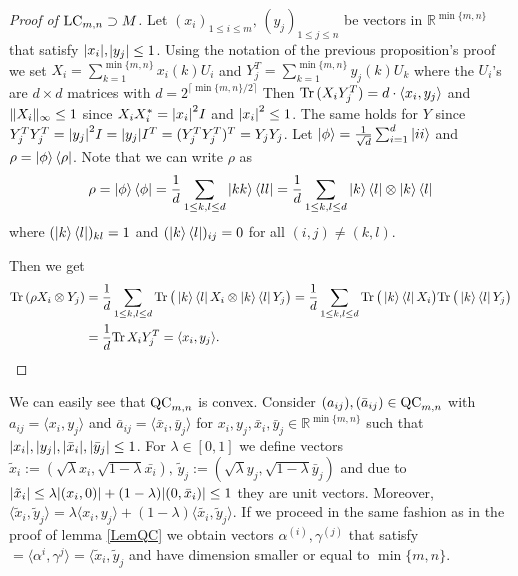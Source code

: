 \begin{proof}[Proof of $ \textup{LC}_{m,n} \supset M $]
	Let $ (x_i)_{1 \le i \le m}, \, (y_j)_{1 \le j \le n} $ be vectors in $\mathbb{R}^{\min \{ m,n \}}$ that satisfy 
	$ {\left|{x_i}\right|},$$ {\left|{y_j}\right|} \le 1 $. 
	Using the notation of the previous proposition's proof we set $ X_i = \sum_{k=1}^{\min \{m,n\}} x_i(k)U_i $ and $ Y_j^{T } = \sum_{k=1}^{\min \{m,n\}}y_j(k)U_k $ where the $ U_i $'s are $ d \times d $ matrices with $  d = 2^{\lceil \min \{m,n\}/2 \rceil} $
	Then $ \text{Tr} \, {(X_iY_j^T)}  = d\cdot \langle x_i, y_j \rangle  $ and $  \Vert {X_i} \Vert_{\infty} \le 1 $ since $ X_iX_i^* = {\left|{x_i}\right|}^2I $ and $ {\left|{x_i}\right|}^2 \le 1  $. The same holds for $ Y $ since $ Y_j^TY_j^T =   {\left|{y_j}\right|}^2I = {\left|{y_j}\right|}I^T = (Y_j^TY_j^T)^T = Y_jY_j  $.
	Let $ \ket{\phi} = \frac{1}{\sqrt{d}}\sum_{i= 1}^{d}\ket{ii} $ and $ \rho = \ket{\phi}\bra{\rho} $. Note that we can write $ \rho $ as
	\begin{align*}
		\rho = \ket{\phi}\bra{\phi} = \frac{1}{d}\sum_{1 \le k,l \le d}\ket{kk}\bra{ll} = \frac{1}{d} \sum_{1 \le k,l \le d}\ket{k}\bra{l} \otimes \ket{k}\bra{l}
	\end{align*}
	where $  (\ket{k}\bra{l})_{kl} = 1 $ and $ (\ket{k}\bra{l})_{ij} = 0 $ for all $ (i,j)\neq (k,l) $.
	
	Then we get 
	\begin{align*}
		\text{Tr} \, {(\rho X_i \otimes Y_j)}  &=\frac{1}{d} \sum_{1 \le k,l \le d} \text{Tr} \, { \big (\ket{k}\bra{l}X_i \otimes \ket{k}\bra{l}Y_j \big )}  = \frac{1}{d} \sum_{1 \le k,l \le d} \text{Tr} \, {\big (\ket{k}\bra{l}X_i \big )}  \text{Tr} \, {\big (\ket{k}\bra{l}Y_j \big )}  \\
		&=  \frac{1}{d} \text{Tr} \, {X_iY_j^T}  = \langle x_i,y_j \rangle.
	\end{align*}
\end{proof}
We can easily see that $ \textup{QC}_{m,n} $ is convex. Consider $ (a_{ij}), (\bar{a}_{ij}) \in \textup{QC}_{m,n} $ with $ a_{ij} = \langle x_i, y_j \rangle $ and $ \bar{a}_{ij} = \langle \bar{x}_i, \bar{y}_j \rangle $ for $ x_{i},y_j, \bar{x}_i,\bar{y}_j \in \mathbb{R}^{\min \{m,n\}} $ such that $ {\left|{x_i}\right|},{\left|{y_j}\right|}, {\left|{\bar{x}_i}\right|}, {\left|{\bar{y}_j}\right|} \le 1 $.
For $ \lambda \in [0,1] $ we define vectors $\tilde{x}_i:= (\sqrt{\lambda}x_i,\sqrt{1-\lambda}\bar{x_i}), \, \tilde{y}_j:= (\sqrt{\lambda}y_j, \sqrt{1-\lambda}\bar{y}_j) $ and due to  $ {\left|{\tilde{x}_i}\right|} \le \lambda {\left|{(x_i,0)}\right|} + (1-\lambda){\left|{(0,\bar{x}_i)}\right|} \le 1 $ they are unit vectors. Moreover, $ \langle \tilde{x}_i, \tilde{y}_j \rangle = \lambda \langle x_i,y_j \rangle + (1-\lambda) \langle \tilde{x_i},\tilde{y}_j \rangle$. If we proceed in the same fashion as in the proof of lemma \ref{LemQC} we obtain vectors 
$ \alpha^{(i)},\gamma^{(j)} $ that satisfy $= \langle \alpha^{i},\gamma^{j} \rangle = \langle \tilde{x} _i, \tilde{y}_j$ and have dimension smaller or equal to $ \min \{m,n\} $.


